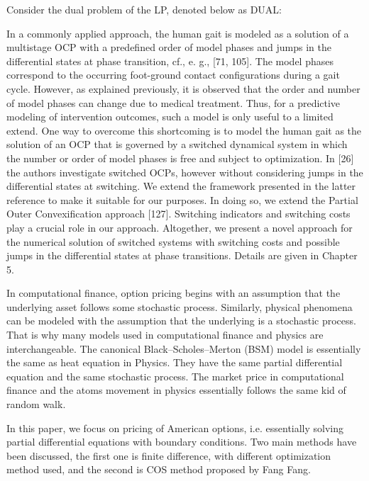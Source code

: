 Consider the dual problem of the LP, denoted below as DUAL: 








In a commonly applied approach, the human gait is modeled as a solution of a multistage OCP with a predefined order of model phases and jumps in the differential
states at phase transition, cf., e. g., [71, 105]. The model phases correspond to the
occurring foot-ground contact configurations during a gait cycle. However, as explained previously, it is observed that the order and number of model phases can
change due to medical treatment. Thus, for a predictive modeling of intervention
outcomes, such a model is only useful to a limited extend. One way to overcome this
shortcoming is to model the human gait as the solution of an OCP that is governed by
a switched dynamical system in which the number or order of model phases is free
and subject to optimization. In [26] the authors investigate switched OCPs, however without considering jumps in the differential states at switching. We extend
the framework presented in the latter reference to make it suitable for our purposes.
In doing so, we extend the Partial Outer Convexification approach [127]. Switching indicators and switching costs play a crucial role in our approach. Altogether,
we present a novel approach for the numerical solution of switched systems with
switching costs and possible jumps in the differential states at phase transitions. Details are given in Chapter 5.





In computational finance, option pricing begins with an assumption that the underlying asset follows some stochastic process. Similarly, physical phenomena can be modeled with the assumption that the underlying is a stochastic process. That is why many models used in computational finance and physics are interchangeable. The canonical Black–Scholes–Merton (BSM) model is essentially the same as heat equation in Physics. They have the same partial differential equation and the same stochastic process. The market price in computational finance and the atoms movement in physics essentially follows the same kid of random walk. 


In this paper, we focus on pricing of American options, i.e. essentially solving partial differential equations with boundary conditions. Two main methods have been discussed, the first one is finite difference, with different optimization method used, and the second is COS method proposed by Fang Fang. 


